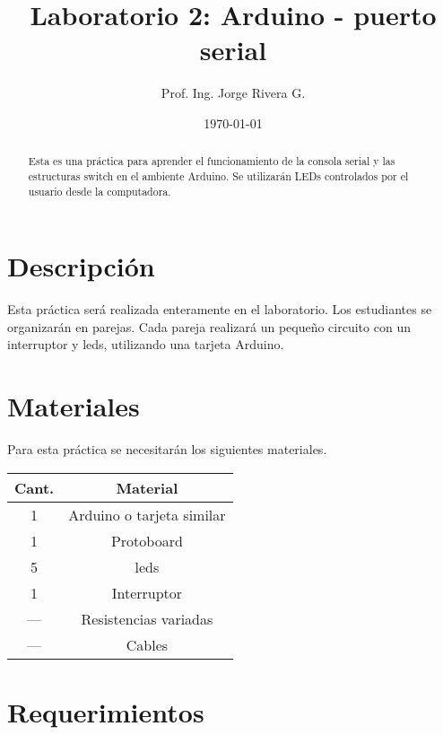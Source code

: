 \documentclass[12pt,letterpaper]{IEEEtran}
\title{Laboratorio 2: Arduino - puerto serial}
\author{Prof. Ing. Jorge Rivera G.}
\date{\today}
\begin{document}

\renewcommand{\leftmark}{UNIVERSIDAD LATINA DE COSTA RICA -- IEC-650 LABORATORIO DE SISTEMAS DIGITALES}

\maketitle


\begin{abstract}
Esta es una práctica para aprender el funcionamiento de la consola serial y las estructuras switch en el ambiente Arduino. Se utilizarán LEDs controlados por el usuario desde la computadora.
\end{abstract}

\section{Descripción}

Esta práctica será realizada enteramente en el laboratorio. Los estudiantes se organizarán en parejas. Cada pareja realizará un pequeño circuito con un interruptor y leds, utilizando una tarjeta Arduino.

\section{Materiales}

Para esta práctica se necesitarán los siguientes materiales.

\begin{center}
\begin{tabular}{c|c}\hline
	Cant. & \hspace{2cm}Material\hspace{2cm} \\\hline\hline
	1 	& Arduino o tarjeta similar		\\\hline
	1	& Protoboard 	\\\hline	
	5	& leds			\\\hline
	1	& Interruptor	\\\hline
	---	& Resistencias variadas \\\hline
	--- & Cables		\\\hline
\end{tabular}
\end{center}

\section{Requerimientos}
\end{document}
